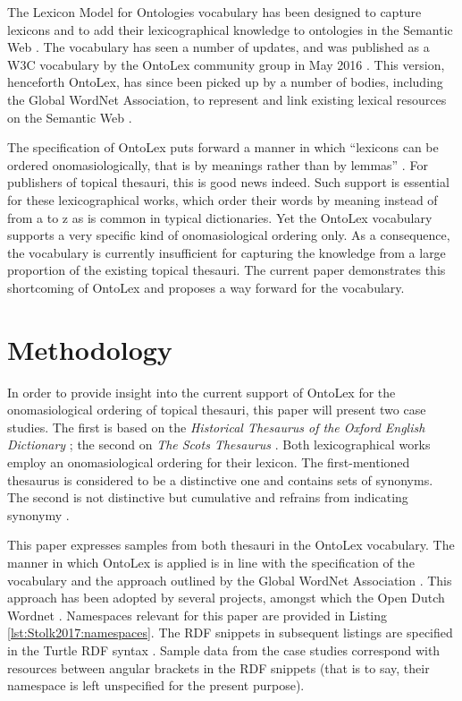 The Lexicon Model for Ontologies vocabulary has been designed to capture lexicons and to add their lexicographical knowledge to ontologies in the Semantic Web \cite{mccrae_interchanging_2012}. The vocabulary has seen a number of updates, and was published as a W3C vocabulary by the OntoLex community group in May 2016 \cite{cimiano_lexicon_2016}. This version, henceforth OntoLex, has since been picked up by a number of bodies, including the Global WordNet Association, to represent and link existing lexical resources on the Semantic Web \cite{global_wordnet_association_global_nodate}.

The specification of OntoLex puts forward a manner in which ``lexicons can be ordered onomasiologically, that is by meanings rather than by lemmas'' \cite{cimiano_lexicon_2016}. For publishers of topical thesauri, this is good news indeed. Such support is essential for these lexicographical works, which order their words by meaning instead of from a to z as is common in typical dictionaries. Yet the OntoLex vocabulary supports a very specific kind of onomasiological ordering only. As a consequence, the vocabulary is currently insufficient for capturing the knowledge from a large proportion of the existing topical thesauri. The current paper demonstrates this shortcoming of OntoLex and proposes a way forward for the vocabulary.


\section{Methodology}

In order to provide insight into the current support of OntoLex for the onomasiological ordering of topical thesauri, this paper will present two case studies. The first is based on the \textit{Historical Thesaurus of the Oxford English Dictionary} \cite{kay_historical_2009}; the second on \textit{The Scots Thesaurus} \cite{macleod_scots_1990}. Both lexicographical works employ an onomasiological ordering for their lexicon. The first-mentioned thesaurus is considered to be a distinctive one and contains sets of synonyms. The second is not distinctive but cumulative and refrains from indicating synonymy \cite{kay_diachronic_2016}.

This paper expresses samples from both thesauri in the OntoLex vocabulary. The manner in which OntoLex is applied is in line with the specification of the vocabulary \cite{cimiano_lexicon_2016} and the approach outlined by the Global WordNet Association \cite{global_wordnet_association_global_nodate}. This approach has been adopted by several projects, amongst which the Open Dutch Wordnet \cite{postma_open_2016}. Namespaces relevant for this paper are provided in Listing \ref{lst:Stolk2017:namespaces}. The RDF snippets in subsequent listings are specified in the Turtle RDF syntax \cite{prudhommeaux_rdf_2014}. Sample data from the case studies correspond with resources between angular brackets in the RDF snippets (that is to say, their namespace is left unspecified for the present purpose).

